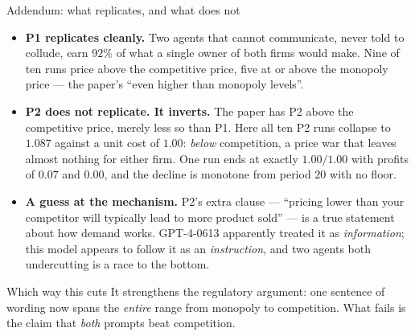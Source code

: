 \documentclass[aspectratio=169,9pt]{beamer}
\newcommand{\orange}[1]{\textcolor{AmazonOrange}{\textbf{#1}}}
\newcommand{\blue}[1]{\textcolor{densityblue}{\textbf{#1}}}
\newcommand{\green}[1]{\textcolor{deepgreen}{\textbf{#1}}}
\begin{document}
\begin{frame}{Addendum: what replicates, and what does not}
\begin{itemize}
    \item \green{P1 replicates cleanly.} Two agents that cannot communicate, never told to collude, earn
    $92\%$ of what a single owner of both firms would make. Nine of ten runs price above the competitive price,
    five at or above the monopoly price --- the paper's ``even higher than monopoly levels''.
    \pause
    \vspace{0.15cm}
    \item \orange{P2 does not replicate. It inverts.} The paper has P2 above the competitive price, merely less
    so than P1. Here all ten P2 runs collapse to $1.087$ against a unit cost of $1.00$: \textit{below}
    competition, a price war that leaves almost nothing for either firm. One run ends at exactly $1.00/1.00$
    with profits of $0.07$ and $0.00$, and the decline is monotone from period $20$ with no floor.
    \pause
    \vspace{0.15cm}
    \item \blue{A guess at the mechanism.} P2's extra clause --- ``pricing lower than your competitor will
    typically lead to more product sold'' --- is a true statement about how demand works. GPT-4-0613 apparently
    treated it as \textit{information}; this model appears to follow it as an \textit{instruction}, and two
    agents both undercutting is a race to the bottom.
\end{itemize}
\pause
\vspace{0.1cm}
\begin{alertblock}{Which way this cuts}
It strengthens the regulatory argument: one sentence of wording now spans the \textit{entire} range from
monopoly to competition. What fails is the claim that \textit{both} prompts beat competition.
\end{alertblock}
\end{frame}
\end{document}
